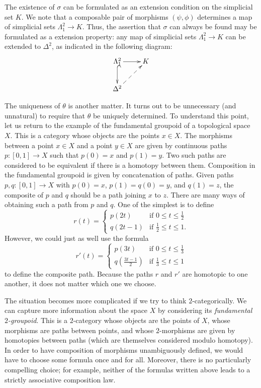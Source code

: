 The existence of $\sigma$ can be formulated as an extension condition on the simplicial set $K$.
We note that a composable pair of morphisms $(\psi, \phi)$ determines a map
of simplicial sets
$\Lambda^2_1 \rightarrow K$. Thus, the assertion that $\sigma$ can
always be found may be formulated as a extension property: any
map of simplicial sets $\Lambda^2_1 \rightarrow K$ can be extended to $\Delta^2$, as indicated in the following diagram:
$$ \xymatrix{ \Lambda^2_1\ar[r]\ar@{^{(}->}[d] & K \\
\Delta^2 \ar@{-->}[ur]}$$

The uniqueness of $\theta$ is another matter. It turns out to be
unnecessary (and unnatural) to require that $\theta$ be uniquely
determined. To understand this point, let us return to 
the example of the fundamental groupoid of a topological space
$X$. This is a category whose objects are the points $x \in X$.
The morphisms between a point $x \in X$ and a point $y \in X$ are given by
continuous paths $p: [0,1] \rightarrow X$ such that $p(0)=x$ and
$p(1)=y$. Two such paths are considered to be equivalent if there
is a homotopy between them. Composition in the fundamental
groupoid is given by concatenation of paths. Given paths $p,q:
[0,1] \rightarrow X$ with $p(0)=x$, $p(1)=q(0)=y$, and $q(1)=z$,
the composite of $p$ and $q$ should be a path joining $x$ to $z$.
There are many ways of obtaining such a path from $p$ and $q$. One
of the simplest is to define
$$r(t) = \begin{cases} p(2t) & \text{if } 0 \leq t \leq \frac{1}{2} \\
q(2t-1) & \text{if } \frac{1}{2} \leq t \leq 1. \end{cases}$$
However, we could just as well use the formula
$$r'(t) = \begin{cases} p(3t) & \text{if } 0 \leq t \leq \frac{1}{3} \\
q(\frac{3t-1}{2}) & \text{if } \frac{1}{3} \leq t \leq 1
\end{cases}$$
to define the composite path. Because the paths $r$ and $r'$ are homotopic to one another, it does not matter which one we choose.

The situation becomes more complicated if we try to think
$2$-categorically. We can capture more information about the space
$X$ by considering its {\it fundamental $2$-groupoid}. This is a
$2$-category whose objects are the points of $X$, whose morphisms
are paths between points, and whose $2$-morphisms are given by
homotopies between paths (which are themselves considered modulo
homotopy). In order to have composition of morphisms unambiguously defined, we would have to choose some formula once and for all.
Moreover, there is no particularly compelling choice; for example,
neither of the formulas written above leads to a strictly associative composition law.

